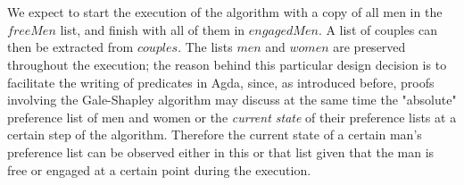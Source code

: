 {\begin{code}
\>[4]\AgdaSpace{}%
\AgdaSymbol{:}\AgdaSpace{}%
\AgdaSpace{}%
\AgdaSymbol{(}\AgdaSpace{}%
\AgdaSpace{}%
\AgdaSpace{}%
\AgdaSymbol{)}\<%
\\
%
\>[4]\AgdaSpace{}%
\AgdaSymbol{:}\AgdaSpace{}%
\AgdaSpace{}%
\AgdaSymbol{(}\AgdaSpace{}%
\AgdaSpace{}%
\AgdaSpace{}%
\AgdaSymbol{)}\<%
\\
%
\>[4]\AgdaSpace{}%
\AgdaSymbol{:}\AgdaSpace{}%
\AgdaSpace{}%
\AgdaSymbol{(}\AgdaSpace{}%
\AgdaSpace{}%
\AgdaSpace{}%
\AgdaSymbol{)}\<%
\\
%
\>[4]\AgdaSpace{}%
\AgdaSymbol{:}\AgdaSpace{}%
\AgdaSpace{}%
\AgdaSymbol{(}\AgdaSpace{}%
\AgdaSpace{}%
\AgdaSpace{}%
\AgdaSymbol{)}\<%
\\
%
\>[4]\AgdaSpace{}%
\AgdaSymbol{:}\AgdaSpace{}%
\AgdaSpace{}%
\AgdaSymbol{(}\AgdaSpace{}%
\AgdaSpace{}%
\AgdaSymbol{)}\<%
\\
%
\>[4]\AgdaSpace{}%
\AgdaSymbol{:}\AgdaSpace{}%
\<%
\\
%
\>[4]\AgdaSpace{}%
\AgdaSymbol{:}\AgdaSpace{}%
\AgdaSpace{}%
\AgdaSpace{}%
\AgdaSpace{}%
\AgdaSpace{}%
\AgdaOperator{\AgdaPrimitive{+}}\AgdaSpace{}%
\AgdaSpace{}%
\<%
\\
\>[0]\<%
\end{code}

We expect to start the execution of the algorithm with a copy of all men in the $freeMen$ list, and finish with all of them in $engagedMen$. A list of couples can then be extracted from $couples$. The lists $men$ and $women$ are preserved throughout the execution; the reason behind this particular design decision is to facilitate the writing of predicates in Agda, since, as introduced before, proofs involving the Gale-Shapley algorithm may discuss at the same time the "absolute" preference list of men and women or the \emph{current state} of their preference lists at a certain step of the algorithm. Therefore the current state of a certain man's preference list can be observed either in this or that list given that the man is free or engaged at a certain point during the execution.

}
